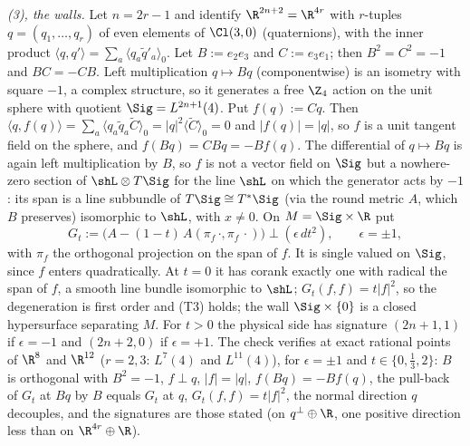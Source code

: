 \emph{(3), the walls.} Let $n = 2r - 1$ and identify $\R^{2n+2} = \R^{4r}$ with $r$-tuples $q = (q_1, \dots, q_r)$ of even elements of $\Cl(3,0)$ (quaternions), with the inner product $\langle q, q' \rangle = \sum_a \langle q_a \tilde q'_a \rangle_0$. Let $B := e_2e_3$ and $C := e_3e_1$; then $B^{2} = C^{2} = -1$ and $BC = -CB$. Left multiplication $q \mapsto Bq$ (componentwise) is an isometry with square $-1$, a complex structure, so it generates a free $\Z_{4}$ action on the unit sphere with quotient $\Sig = L^{2n+1}(4)$. Put $f(q) := Cq$. Then $\langle q, f(q) \rangle = \sum_a \langle q_a \tilde q_a \tilde C \rangle_0 = |q|^{2}\langle \tilde C \rangle_0 = 0$ and $|f(q)| = |q|$, so $f$ is a unit tangent field on the sphere, and $f(Bq) = CBq = -B f(q)$. The differential of $q \mapsto Bq$ is again left multiplication by $B$, so $f$ is not a vector field on $\Sig$ but a nowhere-zero section of $\shL \otimes T\Sig$ for the line $\shL$ on which the generator acts by $-1$: its span is a line subbundle of $T\Sig \cong T^*\Sig$ (via the round metric $A$, which $B$ preserves) isomorphic to $\shL$, with $x \neq 0$. On $M = \Sig \times \R$ put
\[
G_t := \bigl(A - (1-t)\, A(\pi_f\,\cdot, \pi_f\,\cdot)\bigr) \perp (\epsilon\, dt^{2}), \qquad \epsilon = \pm 1,
\]
with $\pi_f$ the orthogonal projection on the span of $f$. It is single valued on $\Sig$, since $f$ enters quadratically. At $t = 0$ it has corank exactly one with radical the span of $f$, a smooth line bundle isomorphic to $\shL$; $G_t(f, f) = t|f|^{2}$, so the degeneration is first order and (T3) holds; the wall $\Sig \times \{0\}$ is a closed hypersurface separating $M$. For $t > 0$ the physical side has signature $(2n+1, 1)$ if $\epsilon = -1$ and $(2n+2, 0)$ if $\epsilon = +1$. The check verifies at exact rational points of $\R^{8}$ and $\R^{12}$ ($r = 2, 3$: $L^{7}(4)$ and $L^{11}(4)$), for $\epsilon = \pm 1$ and $t \in \{0, \tfrac13, 2\}$: $B$ is orthogonal with $B^{2} = -1$, $f \perp q$, $|f| = |q|$, $f(Bq) = -Bf(q)$, the pull-back of $G_t$ at $Bq$ by $B$ equals $G_t$ at $q$, $G_t(f, f) = t|f|^{2}$, the normal direction $q$ decouples, and the signatures are those stated (on $q^{\perp} \oplus \R$, one positive direction less than on $\R^{4r} \oplus \R$).


